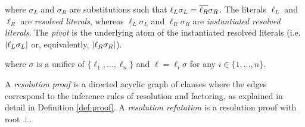 \begin{definition}[Resolution] \label{def:fores} \hfill
\begin{prooftree}
\end{prooftree}
where $\sigma_L$ and $\sigma_R$ are substitutions such that $\ell_L\sigma_L=\dual{\ell_R}\sigma_R$. The literals $\ell_L$ and $\ell_R$ are \emph{resolved literals}, whereas $\ell_L \sigma_L$ and $\ell_R \sigma_R$ are \emph{instantiated resolved literals}. The \emph{pivot} is the underlying atom of the instantiated resolved literals (i.e. $\abs{\ell_L \sigma_L}$ or, equivalently, $\abs{\ell_R \sigma_R}$).
\end{definition}

\begin{definition}[Factoring] \label{def:fofact} \hfill

\begin{prooftree}
\end{prooftree}
where $\sigma$ is a unifier of $\{\ell_1,\ldots,\ell_n\}$ and $\ell=\ell_i\sigma$ for any $i\in \{1,\ldots,n\}$.
\end{definition}

A \emph{resolution proof} is a directed acyclic graph of clauses where the edges correspond to the inference rules of resolution and factoring, as explained in detail in Definition \ref{def:proof}. A \emph{resolution refutation} is a resolution proof with root $\bot$.

